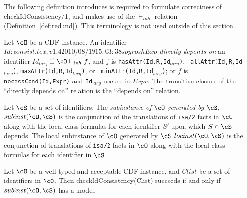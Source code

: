 The following definition introduces is required to formulate
correctness of {\sf checkIdConsistency/1}, and makes use of the
$\vdash_{inh}$ relation (Definition~\ref{def:redund}).  This
terminology is not used outside of this section.
\begin{definition}
 Let $\cO$ be a CDF instance.  An identifier $Id: consist.tex,v 1.4 2010/08/19 15:03:38 spyrosh Exp $ {\em directly
 depends on} an identifier $Id_{targ}$ if $\cO \vdash_{inh} f$, and
 $f$ is {\tt hasAttr(Id,R,Id$_{targ}$)}, {\tt
 allAttr(Id,R,Id$_{targ}$)}, {\tt maxAttr(Id,R,Id$_{targ}$)}, or {\tt
 minAttr(Id,R,Id$_{targ}$)}; or $f$ is {\tt necessCond(Id,Expr)} and
 {\tt Id$_{targ}$} occurs in $Expr$.  The transitive closure of the
 ``directly depends on'' relation is the ``depends on'' relation.

Let $\cS$ be a set of identifiers.  The {\em subinstance of $\cO$
generated by $\cS$}, $subinst(\cO,\cS)$ is the conjunction of the
translations of {\tt isa/2} facts in $\cO$ along with the local class
formulas for each identifier $S'$ upon which $S \in \cS$ depends.  The
local subinstance of $\cO$ generated by $\cS$ $locinst(\cO,\cS)$ is
the conjunction of translations of {\tt isa/2} facts in $\cO$ along
with the local class formulas for each identifier in $\cS$.
\end{definition}

\begin{theorem} \label{thm:type1consist}
Let $\cO$ be a well-typed and acceptable CDF instance, and $Clist$ be
a set of identifiers in $\cO$.  Then {\sf checkIdConsistency(Clist)}
succeeds if and only if $subinst(\cO,\cS)$ has a model.
\end{theorem}

